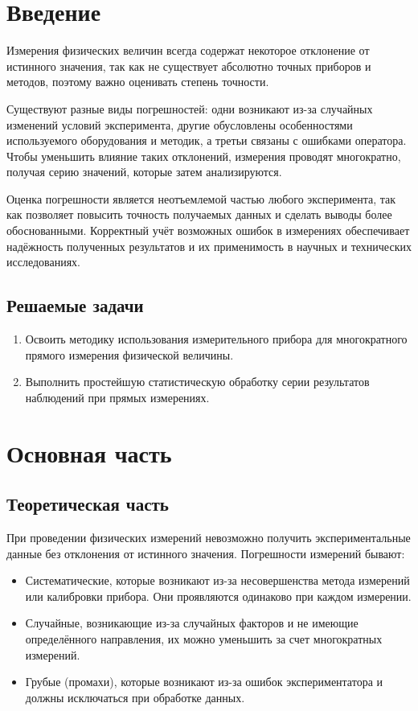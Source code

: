 \section{Введение}

Измерения физических величин всегда содержат некоторое отклонение от истинного значения, так как не существует абсолютно точных приборов и методов, поэтому важно оценивать степень точности.

Существуют разные виды погрешностей: одни возникают из-за случайных изменений условий эксперимента, другие обусловлены особенностями используемого оборудования и методик, а третьи связаны с ошибками оператора. Чтобы уменьшить влияние таких отклонений, измерения проводят многократно, получая серию значений, которые затем анализируются.

Оценка погрешности является неотъемлемой частью любого эксперимента, так как позволяет повысить точность получаемых данных и сделать выводы более обоснованными. Корректный учёт возможных ошибок в измерениях обеспечивает надёжность полученных результатов и их применимость в научных и технических исследованиях.

\subsection{Решаемые задачи}

\begin{enumerate}
    \item Освоить методику использования измерительного прибора для многократного прямого измерения физической величины.
    \item Выполнить простейшую статистическую обработку серии результатов наблюдений  при прямых измерениях.
\end{enumerate}

\section{Основная часть}

\subsection{Теоретическая часть}

При проведении физических измерений невозможно получить экспериментальные данные без отклонения от истинного значения. Погрешности измерений бывают:
\begin{itemize}
    \item Систематические, которые возникают из-за несовершенства метода измерений или калибровки прибора. Они проявляются одинаково при каждом измерении.
    \item Случайные, возникающие из-за случайных факторов и не имеющие определённого направления, их можно уменьшить за счет многократных измерений.
    \item Грубые (промахи), которые возникают из-за ошибок экспериментатора и должны исключаться при обработке данных.
\end{itemize}

